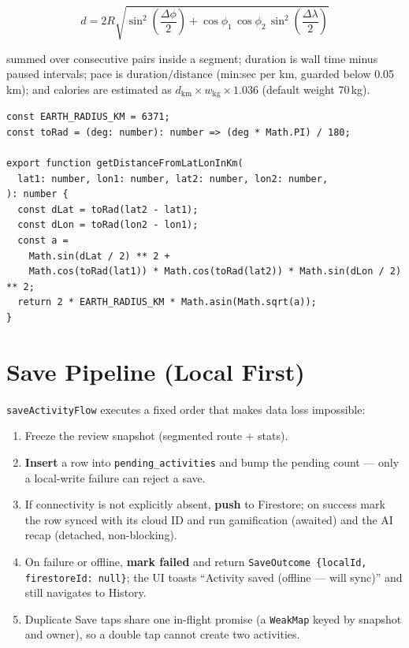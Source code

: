 \documentclass[12pt, a4paper]{report}
\newcommand{\code}[1]{\texttt{#1}}
\begin{document}
\begin{equation}
d = 2R \sqrt{ \sin^{2}\!\left(\frac{\Delta\phi}{2}\right)
  + \cos\phi_{1}\,\cos\phi_{2}\,\sin^{2}\!\left(\frac{\Delta\lambda}{2}\right)}
\end{equation}

\noindent summed over consecutive pairs inside a segment; duration is wall
time minus paused intervals; pace is $\text{duration}/\text{distance}$
(min:sec per km, guarded below 0.05\,km); and calories are estimated as
$d_{\text{km}} \times w_{\text{kg}} \times 1.036$ (default weight 70\,kg).

\begin{lstlisting}[caption={Haversine utility (excerpt, \code{src/utils/geo.ts})}]
const EARTH_RADIUS_KM = 6371;
const toRad = (deg: number): number => (deg * Math.PI) / 180;

export function getDistanceFromLatLonInKm(
  lat1: number, lon1: number, lat2: number, lon2: number,
): number {
  const dLat = toRad(lat2 - lat1);
  const dLon = toRad(lon2 - lon1);
  const a =
    Math.sin(dLat / 2) ** 2 +
    Math.cos(toRad(lat1)) * Math.cos(toRad(lat2)) * Math.sin(dLon / 2) ** 2;
  return 2 * EARTH_RADIUS_KM * Math.asin(Math.sqrt(a));
}
\end{lstlisting}

\section{Save Pipeline (Local First)}
\code{saveActivityFlow} executes a fixed order that makes data loss
impossible:

\begin{enumerate}[leftmargin=1.2cm]
  \item Freeze the review snapshot (segmented route + stats).
  \item \textbf{Insert} a row into \code{pending\_activities} and bump the
        pending count --- only a local-write failure can reject a save.
  \item If connectivity is not explicitly absent, \textbf{push} to Firestore;
        on success mark the row synced with its cloud ID and run gamification
        (awaited) and the AI recap (detached, non-blocking).
  \item On failure or offline, \textbf{mark failed} and return
        \code{SaveOutcome \{localId, firestoreId: null\}}; the UI toasts
        ``Activity saved (offline --- will sync)'' and still navigates to
        History.
  \item Duplicate Save taps share one in-flight promise (a \code{WeakMap}
        keyed by snapshot and owner), so a double tap cannot create two
        activities.
\end{enumerate}
\end{document}

